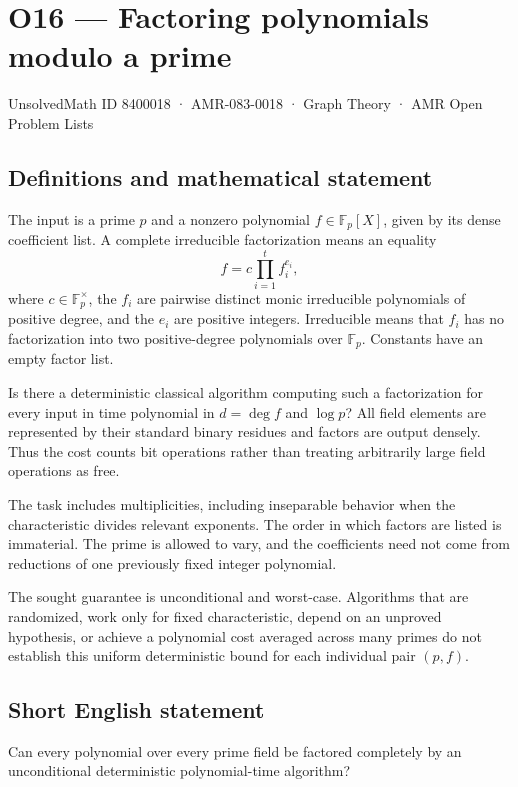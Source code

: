 \documentclass[11pt,a4paper]{article}
\begin{document}
\section*{O16 — Factoring polynomials modulo a prime}\label{8400018}
{\small UnsolvedMath ID 8400018 · AMR-083-0018 · Graph Theory · AMR Open Problem Lists}
\subsection{Definitions and mathematical statement}
The input is a prime $p$ and a nonzero polynomial $f\in\mathbb F_p[X]$, given by its dense coefficient list. A complete irreducible factorization means an equality
\[
f=c\prod_{i=1}^t f_i^{e_i},
\]
where $c\in\mathbb F_p^\times$, the $f_i$ are pairwise distinct monic irreducible polynomials of positive degree, and the $e_i$ are positive integers. Irreducible means that $f_i$ has no factorization into two positive-degree polynomials over $\mathbb F_p$. Constants have an empty factor list.

Is there a deterministic classical algorithm computing such a factorization for every input in time polynomial in $d=\deg f$ and $\log p$? All field elements are represented by their standard binary residues and factors are output densely. Thus the cost counts bit operations rather than treating arbitrarily large field operations as free.

The task includes multiplicities, including inseparable behavior when the characteristic divides relevant exponents. The order in which factors are listed is immaterial. The prime is allowed to vary, and the coefficients need not come from reductions of one previously fixed integer polynomial.

The sought guarantee is unconditional and worst-case. Algorithms that are randomized, work only for fixed characteristic, depend on an unproved hypothesis, or achieve a polynomial cost averaged across many primes do not establish this uniform deterministic bound for each individual pair $(p,f)$.
\subsection{Short English statement}
Can every polynomial over every prime field be factored completely by an unconditional deterministic polynomial-time algorithm?
\end{document}
